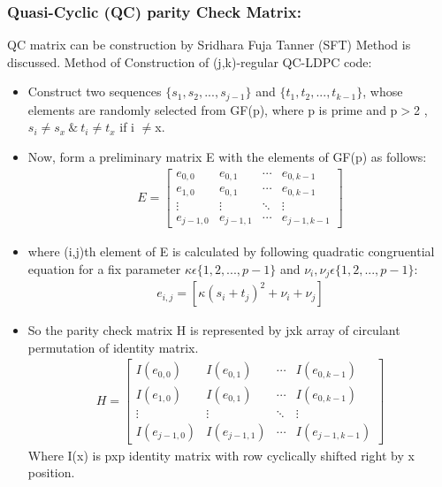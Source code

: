 \documentclass[xcolor=dvipsname]
{beamer}
\begin{document}
\begin{frame}[t] 
\frametitle{ Quasi-Cyclic (QC) parity Check Matrix:}
QC matrix can be construction by 
Sridhara Fuja Tanner (SFT) Method is discussed. 
Method of Construction of (j,k)-regular QC-LDPC code:
\begin{itemize}
\item Construct two sequences $\{s_1,s_2,...,s_{j-1}\}$ and $\{t_1,t_2,...,t_{k-1}\}$, whose elements are randomly selected from GF(p), where p is prime and p$>$2 , $s_i \neq s_x \ \& \ t_i \neq t_x$ if i $\neq$x.
\item Now, form a preliminary matrix E with the elements of GF(p) as follows:
\begin{align}
 E= \left[ \begin{array}{cccc}
e_{0,0} & e_{0,1} & \cdots & e_{0,k-1} \\
e_{1,0} & e_{0,1} & \cdots & e_{0,k-1} \\
\vdots & \vdots & \ddots & \vdots \\
e_{j-1,0} & e_{j-1,1} & \cdots & e_{j-1,k-1} 
\end{array} \right] 
\end{align}
\end{itemize}
\end{frame}

 
 \begin{frame}
 \begin{itemize}
\item where (i,j)th element of E is calculated by following quadratic congruential equation for a fix parameter
$\kappa\epsilon\{1,2,...,p-1\} $ and $\nu_i,\nu_j\epsilon\{1,2,...,p-1\} $: 
\begin{align}
 e_{i,j}=[\kappa(s_i+t_j)^2 + \nu_i +\nu_j] 
\end{align}
\item So the parity check matrix H is represented by jxk array of circulant permutation of identity matrix. 
\begin{align}
 H= \left[ \begin{array}{cccc}
I(e_{0,0}) & I(e_{0,1}) & \cdots & I(e_{0,k-1}) \\
I(e_{1,0}) & I(e_{0,1}) & \cdots & I(e_{0,k-1}) \\
\vdots & \vdots & \ddots & \vdots \\
I(e_{j-1,0}) & I(e_{j-1,1}) & \cdots & I(e_{j-1,k-1}) 
\end{array} \right]
\end{align} 
Where I(x) is pxp identity matrix with row cyclically shifted right by x position.
\end{itemize}
 \end{frame}
 
\end{document}
